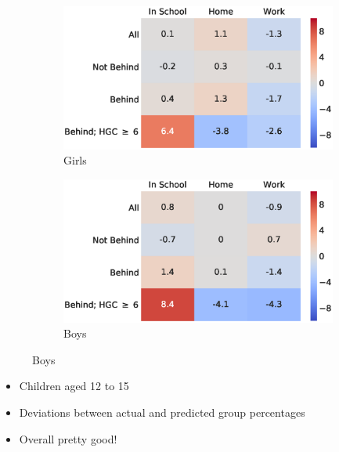 \documentclass[11pt]{beamer}
\begin{document}
\begin{frame}[c]%

    \begin{figure}
        \centering
        \caption{Actual And Predicted Choices}
        \begin{subfigure}[c]{0.5\textwidth}
            \centering
            \includegraphics[width=\textwidth]{graphs/girls_table1.eps}
            \caption{Girls}
        \end{subfigure}%
        \begin{subfigure}[c]{0.5\textwidth}
            \centering
            \includegraphics[width=\textwidth]{graphs/boys_table1.eps}
            \caption{Boys}
        \end{subfigure}

    \end{figure}
    \begin{itemize}
        \item Children aged 12 to 15
        \item Deviations between actual and predicted group percentages
        \item Overall pretty good!
    \end{itemize}
\end{frame}
\end{document}
